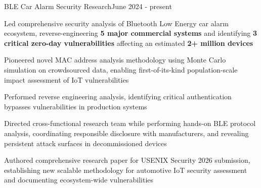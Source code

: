 \begin{joblong}{BLE Car Alarm Security Research}{June 2024 - present}
	\item Led comprehensive security analysis of Bluetooth Low Energy car alarm ecosystem, reverse-engineering \textbf{5 major commercial systems} and identifying \textbf{3 critical zero-day vulnerabilities} affecting an estimated \textbf{2+ million devices}
	\item Pioneered novel MAC address analysis methodology using Monte Carlo simulation on crowdsourced data, enabling first-of-its-kind population-scale impact assessment of IoT vulnerabilities
	\item Performed reverse engineering analysis, identifying critical authentication bypasses vulnerabilities in production systems
	\item Directed cross-functional research team while performing hands-on BLE protocol analysis, coordinating responsible disclosure with manufacturers, and revealing persistent attack surfaces in decommissioned devices
	\item Authored comprehensive research paper for USENIX Security 2026 submission, establishing new scalable methodology for automotive IoT security assessment and documenting ecosystem-wide vulnerabilities
\end{joblong}
